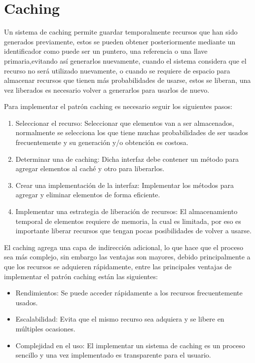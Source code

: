 \documentclass[12pt,a4paper,spanish,openany]{book}
\begin{document}
\section{Caching}



Un sistema de caching permite guardar temporalmente recursos que han sido
generados previamente, estos se pueden obtener posteriormente mediante un
identificador como puede ser un puntero, una referencia o una llave
primaria,evitando así generarlos nuevamente, cuando el sistema considera que el
recurso no será utilizado nuevamente, o cuando se requiere de espacio para
almacenar recursos que tienen más probabilidades de usarse, estos se liberan,
una vez liberados es necesario volver a generarlos para usarlos de nuevo.

Para implementar el patrón caching es necesario seguir los siguientes pasos:

\begin{enumerate} 
  \item Seleccionar el recurso: Seleccionar que elementos van a ser almacenados,
  normalmente se selecciona los que tiene muchas probabilidades de ser usados
  frecuentemente y su generación y/o obtención es costosa.
  \item Determinar una de caching: Dicha interfaz debe contener un método para
  agregar elementos al caché y otro para liberarlos.
 \item Crear una implementación de la interfaz: Implementar los métodos para
 agregar y eliminar elementos de forma eficiente.
 \item Implementar una estrategia de liberación de recursos: El almacenamiento
 temporal de elementos requiere de memoria, la cual es limitada, por eso es
 importante liberar recursos que tengan pocas posibilidades de volver a
 usarse.
\end{enumerate}


El caching agrega una capa de indirección adicional, lo que hace que el proceso
sea más complejo, sin embargo las ventajas son mayores, debido principalmente a
que los recursos se adquieren rápidamente, entre las principales ventajas de implementar
el patrón caching están las siguientes:

\begin{itemize}
  \item Rendimientos: Se puede acceder rápidamente a los recursos frecuentemente
  usados.
  \item Escalabilidad: Evita que el mismo recurso sea adquiera y se libere en
  múltiples ocasiones.
  \item Complejidad en el uso: El implementar un sistema de caching es un
  proceso sencillo y una vez implementado es transparente para el usuario.
\end{itemize}
\end{document}
